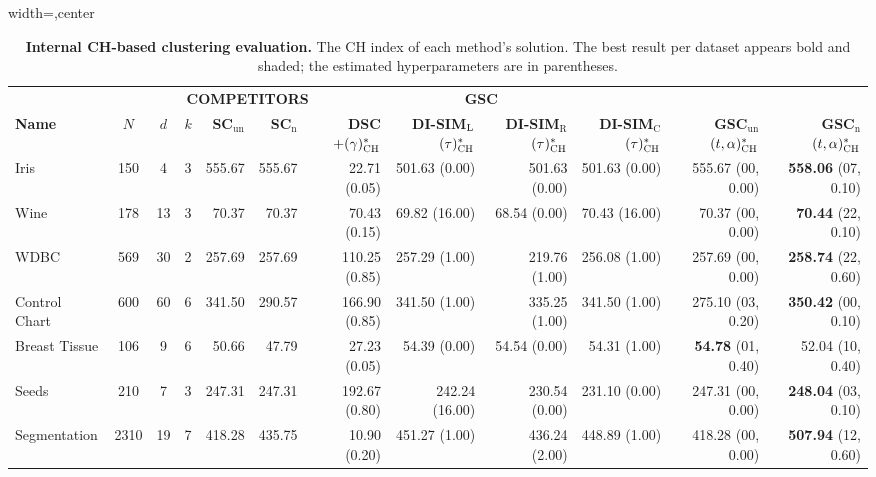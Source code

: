 \documentclass[10pt]{article} %
\newcommand{\bestcell}[1]{\cellcolor{gray!30}\textbf{#1}}
\newcommand{\GSC}{GSC\xspace}
\newcommand{\bestpar}[2] {(#1)^*_{\textsc{#2}}}
\newcommand{\hyperp}[1]{\tiny{\tiny(#1)}}
\begin{document}
\begin{table}[t]
\scriptsize
\centering
%
\caption{\textbf{Internal CH-based clustering evaluation.} The CH index of each method's solution. The best result per dataset appears bold and shaded; the estimated hyperparameters are in parentheses.}
\vskip -5pt
\label{tab:ch_clustering_scores}
\begin{adjustbox}{width=\linewidth,center}
\begin{tabular}{lccc|rrrrrr|rr}
\Xhline{1pt}
\multicolumn{4}{c|}{\fontsize{6pt}{6pt}\textbf{DATASETS}} & \multicolumn{6}{c|}{\fontsize{6pt}{6pt}\textbf{COMPETITORS}} & \multicolumn{2}{c}{\fontsize{6pt}{6pt}\textbf{\GSC}}\\[0.25em]
\textbf{Name} & $N$ & $d$ & $k$
& \textbf{SC$_{\text{un}}$} & \textbf{SC$_{\text{n}}$} & \textbf{DSC}$+\bestpar{\gamma}{CH}$
& \textbf{DI-SIM$_{\textup{L}}$}$\bestpar{\tau}{CH}$ & \textbf{DI-SIM$_{\text{R}}$}$\bestpar{\tau}{CH}$ & \textbf{DI-SIM$_{\text{C}}$}$\bestpar{\tau}{CH}$
& \textbf{GSC$_{\text{un}}$}$\bestpar{t,\alpha}{CH}$ & \textbf{GSC$_{\text{n}}$}$\bestpar{t,\alpha}{CH}$ \\[0.25em]
\hline
Iris & 150 & 4 & 3 & 555.67 & 555.67 & 22.71 \hyperp{0.05} & 501.63 \hyperp{0.00} & 501.63 \hyperp{0.00} & 501.63 \hyperp{0.00} & 555.67 \hyperp{00, 0.00} & \bestcell{558.06} \hyperp{07, 0.10} \\
Wine & 178 & 13 & 3 & 70.37 & 70.37 & 70.43 \hyperp{0.15} & 69.82 \hyperp{16.00} & 68.54 \hyperp{0.00} & 70.43 \hyperp{16.00} & 70.37 \hyperp{00, 0.00} & \bestcell{70.44} \hyperp{22, 0.10} \\
WDBC & 569 & 30 & 2 & 257.69 & 257.69 & 110.25 \hyperp{0.85} & 257.29 \hyperp{1.00} & 219.76 \hyperp{1.00} & 256.08 \hyperp{1.00} & 257.69 \hyperp{00, 0.00} & \bestcell{258.74} \hyperp{22, 0.60} \\
Control Chart & 600 & 60 & 6 & 341.50 & 290.57 & 166.90 \hyperp{0.85} & 341.50 \hyperp{1.00} & 335.25 \hyperp{1.00} & 341.50 \hyperp{1.00} & 275.10 \hyperp{03, 0.20} & \bestcell{350.42} \hyperp{00, 0.10} \\
Breast Tissue & 106 & 9 & 6 & 50.66 & 47.79 & 27.23 \hyperp{0.05} & 54.39 \hyperp{0.00} & 54.54 \hyperp{0.00} & 54.31 \hyperp{1.00} & \bestcell{54.78} \hyperp{01, 0.40} & 52.04 \hyperp{10, 0.40} \\
Seeds & 210 & 7 & 3 & 247.31 & 247.31 & 192.67 \hyperp{0.80} & 242.24 \hyperp{16.00} & 230.54 \hyperp{0.00} & 231.10 \hyperp{0.00} & 247.31 \hyperp{00, 0.00} & \bestcell{248.04} \hyperp{03, 0.10} \\
Segmentation & 2310 & 19 & 7 & 418.28 & 435.75 & 10.90 \hyperp{0.20} & 451.27 \hyperp{1.00} & 436.24 \hyperp{2.00} & 448.89 \hyperp{1.00} & 418.28 \hyperp{00, 0.00} & \bestcell{507.94} \hyperp{12, 0.60} \\

\end{tabular}
\end{adjustbox}
\end{table}
\end{document}
